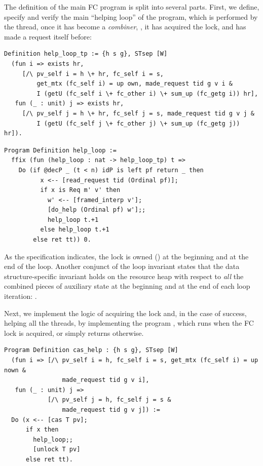 The definition of the main FC program is split into several
parts. First, we define, specify and verify the main ``helping loop''
of the program, which is performed by the thread, once it has become a
\emph{combiner}, \ie, it has acquired the lock, and has made a request
itself before:

\begin{lstlisting}
Definition help_loop_tp := {h s g}, STsep [W] 
  (fun i => exists hr, 
     [/\ pv_self i = h \+ hr, fc_self i = s, 
         get_mtx (fc_self i) = up own, made_request tid g v i &
         I (getU (fc_self i \+ fc_other i) \+ sum_up (fc_getg i)) hr], 
   fun (_ : unit) j => exists hr,
     [/\ pv_self j = h \+ hr, fc_self j = s, made_request tid g v j &
         I (getU (fc_self j \+ fc_other j) \+ sum_up (fc_getg j)) hr]).
\end{lstlisting}

\begin{lstlisting}
Program Definition help_loop :=
  ffix (fun (help_loop : nat -> help_loop_tp) t => 
    Do (if @decP _ (t < n) idP is left pf return _ then 
          x <-- [read_request tid (Ordinal pf)];
          if x is Req m' v' then 
            w' <-- [framed_interp v'];
            [do_help (Ordinal pf) w'];;
            help_loop t.+1
          else help_loop t.+1
        else ret tt)) 0.      
\end{lstlisting}

As the specification  indicates, the lock is owned
() at the beginning and at the end
of the loop. Another conjunct of the loop invariant states that the
data structure-specific invariant  holds on the resource heap
 with respect to \emph{all} the combined pieces of auxiliary
state at the beginning and at the end of each loop iteration: .

Next, we implement the logic of acquiring the lock and, in the case of
success, helping all the threads, by implementing the program
, which runs  when the FC lock is
acquired, or simply returns otherwise.

\begin{lstlisting}
Program Definition cas_help : {h s g}, STsep [W]
  (fun i => [/\ pv_self i = h, fc_self i = s, get_mtx (fc_self i) = up nown &
                made_request tid g v i], 
   fun (_ : unit) j => 
            [/\ pv_self j = h, fc_self j = s & 
                made_request tid g v j]) := 
  Do (x <-- [cas T pv];
      if x then 
        help_loop;; 
        [unlock T pv] 
      else ret tt).  
\end{lstlisting}

